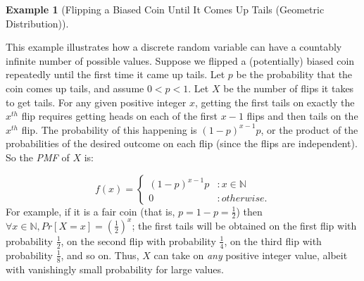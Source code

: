 \documentclass[
]{article}
\theoremstyle{definition}
\theoremstyle{definition}
\newtheorem{example}{Example}[section]
\theoremstyle{definition}
\theoremstyle{remark}
\begin{document}
\begin{example}[Flipping a Biased Coin Until It Comes Up Tails (Geometric Distribution)]
\protect\hypertarget{exm:unlabeled-div-24}{}\label{exm:unlabeled-div-24}

This example illustrates how a discrete random variable can have a countably infinite number of possible values. Suppose we flipped a (potentially) biased coin repeatedly until the first time it came up tails. Let \(p\) be the probability that the coin comes up tails, and assume \(0 < p < 1\). Let \(X\) be the number of flips it takes to get tails. For any given positive integer \(x\), getting the first tails on exactly the \(x^{th}\) flip requires getting heads on each of the first \(x - 1\) flips and then tails on the \(x^{th}\) flip. The probability of this happening is \((1 - p)^{x - 1}p\), or the product of the probabilities of the desired outcome on each flip (since the flips are independent). So the \emph{PMF} of \(X\) is:

\[f(x) = \begin{cases} (1 - p)^{x - 1}p & : x \in \mathbb{N} \\ 0 & : otherwise. \end{cases}\]
For example, if it is a fair coin (that is, \(p = 1 - p = \frac{1}{2}\)) then \(\forall x \in \mathbb{N}, Pr[X = x] = (\frac{1}{2})^{x}\); the first tails will be obtained on the first flip with probability \(\frac{1}{2}\), on the second flip with probability \(\frac{1}{4}\), on the third flip with probability \(\frac{1}{8}\), and so on. Thus, \(X\) can take on \emph{any} positive integer value, albeit with vanishingly small probability for large values.

\end{example}
\end{document}
